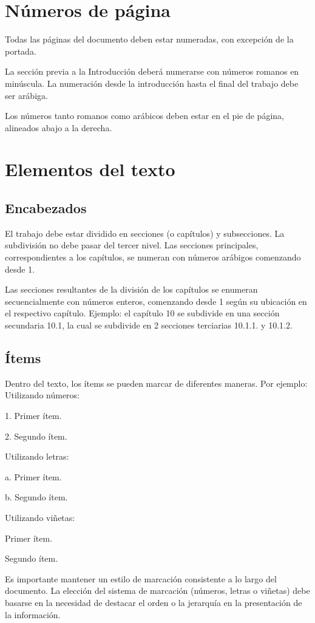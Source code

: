 \section{Números de página}
Todas las páginas del documento deben estar numeradas, con excepción de la portada.  

La sección previa a la Introducción deberá numerarse con números romanos en minúscula. La numeración desde la introducción hasta el final del trabajo debe ser arábiga.  

Los números tanto romanos como arábicos deben estar en el pie de página, alineados abajo a la derecha. 

\section{Elementos del texto}
\subsection{Encabezados}
El trabajo debe estar dividido en secciones (o capítulos) y subsecciones. La subdivisión no debe pasar del tercer nivel. Las secciones principales, correspondientes a los capítulos, se numeran con números arábigos comenzando desde 1.

Las secciones resultantes de la división de los capítulos se enumeran secuencialmente con números enteros, comenzando desde 1 según su ubicación en el respectivo capítulo. Ejemplo: el capítulo 10 se subdivide en una sección secundaria 10.1, la cual se subdivide en 2 secciones terciarias 10.1.1. y 10.1.2.

\subsection{Ítems}
Dentro del texto, los ítems se pueden marcar de diferentes maneras. Por ejemplo: Utilizando números: 

1. Primer ítem. 

2. Segundo ítem. 

Utilizando letras: 

a. Primer ítem. 

b. Segundo ítem. 

Utilizando viñetas: 

Primer ítem. 

Segundo ítem. 

Es importante mantener un estilo de marcación consistente a lo largo del documento. La elección del sistema de marcación (números, letras o viñetas) debe basarse en la necesidad de destacar el orden o la jerarquía en la presentación de la información. 

